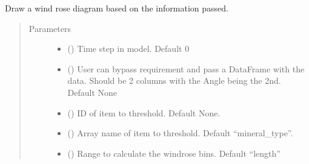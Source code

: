 \documentclass[letterpaper,10pt,english]{sphinxmanual}
\begin{document}
\begin{fulllineitems}
\begin{fulllineitems}
\end{fulllineitems}


\begin{fulllineitems}
\label{\detokenize{openfdem:openfdem.openfdem.Model.draw_rose_diagram}}
Draw a wind rose diagram based on the information passed.
\begin{quote}\begin{description}
\item[{Parameters}] \leavevmode\begin{itemize}
\item {} 
 () \textendash{} Time step in model. Default 0

\item {} 
 () \textendash{} User can bypass requirement and pass a DataFrame with the data. Should be 2 columns with the Angle being the 2nd. Default None

\item {} 
 () \textendash{} ID of item to threshold. Default None.

\item {} 
 () \textendash{} Array name of item to threshold. Default “mineral\_type”.

\item {} 
 () \textendash{} Range to calculate the windrose bins. Default “length”

\end{itemize}


\end{description}
\end{quote}
\end{fulllineitems}
\end{fulllineitems}
\end{document}
